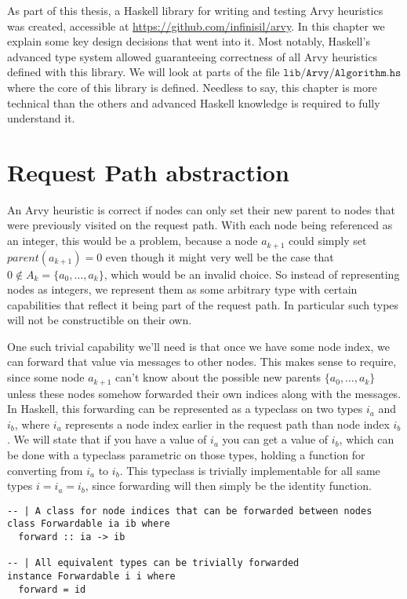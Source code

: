 \documentclass[a4paper, oneside]{discothesis}
\begin{document}
As part of this thesis, a Haskell library for writing and testing Arvy heuristics was created, accessible at \url{https://github.com/infinisil/arvy}. In this chapter we explain some key design decisions that went into it. Most notably, Haskell's advanced type system allowed guaranteeing correctness of all Arvy heuristics defined with this library. We will look at parts of the file \href{https://github.com/Infinisil/arvy/blob/1bdac2aa8e599372f2b058d26ec9c33fd53d7a72/lib/Arvy/Algorithm.hs}{$\texttt{lib/Arvy/Algorithm.hs}$} where the core of this library is defined. Needless to say, this chapter is more technical than the others and advanced Haskell knowledge is required to fully understand it.

\section{Request Path abstraction}

An Arvy heuristic is correct if nodes can only set their new parent to nodes that were previously visited on the request path. With each node being referenced as an integer, this would be a problem, because a node $a_{k+1}$ could simply set $parent(a_{k+1})=0$ even though it might very well be the case that $0\notin A_k=\{a_{0},\dots,a_{k}\}$, which would be an invalid choice. So instead of representing nodes as integers, we represent them as some arbitrary type with certain capabilities that reflect it being part of the request path. In particular such types will not be constructible on their own.

One such trivial capability we'll need is that once we have some node index, we can forward that value via messages to other nodes. This makes sense to require, since some node $a_{k+1}$ can't know about the possible new parents $\{a_{0},\dots,a_{k}\}$ unless these nodes somehow forwarded their own indices along with the messages. In Haskell, this forwarding can be represented as a typeclass on two types $i_a$ and $i_b$, where $i_a$ represents a node index earlier in the request path than node index $i_b$. We will state that if you have a value of $i_a$ you can get a value of $i_b$, which can be done with a typeclass parametric on those types, holding a function for converting from $i_a$ to $i_b$. This typeclass is trivially implementable for all same types $i=i_a=i_b$, since forwarding will then simply be the identity function.

\begin{verbatim}
-- | A class for node indices that can be forwarded between nodes
class Forwardable ia ib where
  forward :: ia -> ib

-- | All equivalent types can be trivially forwarded
instance Forwardable i i where
  forward = id
\end{verbatim}
\end{document}
